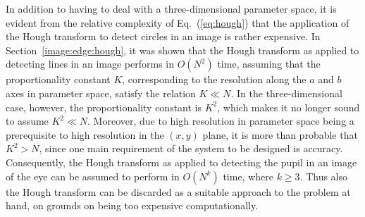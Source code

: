 In addition to having to deal with a three-dimensional parameter
space, it is evident from the relative complexity of
Eq.~(\ref{eq:hough}) that the application of the Hough transform to
detect circles in an image is rather expensive.  In
Section~\ref{image:edge:hough}, it was shown that the Hough transform
as applied to detecting lines in an image performs in $O(N^{2})$ time,
assuming that the proportionality constant $K$, corresponding to the
resolution along the $a$ and $b$ axes in parameter space, satisfy the
relation $K\ll N$.  In the three-dimensional case, however, the
proportionality constant is $K^{2}$, which makes it no longer sound to
assume $K^{2}\ll N$.  Moreover, due to high resolution in parameter
space being a prerequisite to high resolution in the $(x,y)$ plane, it
is more than probable that $K^{2}>N$, since one main requirement of
the system to be designed is accuracy.  Consequently, the Hough
transform as applied to detecting the pupil in an image of the eye can
be assumed to perform in $O(N^{k})$ time, where $k\geq 3$.  Thus also
the Hough transform can be discarded as a suitable approach to the
problem at hand, on grounds on being too expensive computationally.

